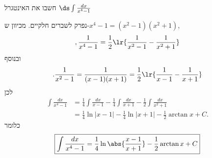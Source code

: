 חשבו את האינטגרל
$\ds \int \frac{dx}{x^{4}-1}$
\begin{solbox}
\unverified
נפרק לשברים חלקיים. מכיוון ש-$x^4-1=(x^2-1)(x^2+1)$,
$$,\frac{1}{x^4-1}=\frac12\lr{\frac{1}{x^2-1}-\frac{1}{x^2+1}}$$
ובנוסף
$$.\frac{1}{x^2-1}=\frac{1}{(x-1)(x+1)}=\frac12\lr{\frac{1}{x-1}-\frac{1}{x+1}}$$
לכן
\begin{align*}
\int\frac{dx}{x^4-1}
&=\frac14\int\frac{dx}{x-1}-\frac14\int\frac{dx}{x+1}-\frac12\int\frac{dx}{x^2+1}\\
&=\frac14\ln|x-1|-\frac14\ln|x+1|-\frac12\arctan x+C.
\end{align*}
כלומר
\begin{align*}
\boxed{\int\frac{dx}{x^4-1}=\frac14\ln\abs{\frac{x-1}{x+1}}-\frac12\arctan x+C}
\end{align*}
\end{solbox}
